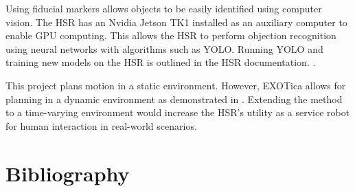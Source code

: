 \documentclass[12pt]{article}
\begin{document}
        \par Using fiducial markers allows objects to be easily identified using computer vision. The HSR has an Nvidia Jetson TK1 installed as an auxiliary computer to enable GPU computing. This allows the HSR to perform objection recognition using neural networks with algorithms such as YOLO. Running YOLO and training new models on the HSR is outlined in the HSR documentation. \cite{noauthor_hsrb_manual_nodate}.

        \par This project plans motion in a static environment. However, EXOTica allows for planning in a dynamic environment as demonstrated in \cite{yang_planning_2018}. Extending the method to a time-varying environment would increase the HSR's utility as a service robot for human interaction in real-world scenarios.

    \newpage

\section{Bibliography}
    
    
\end{document}
